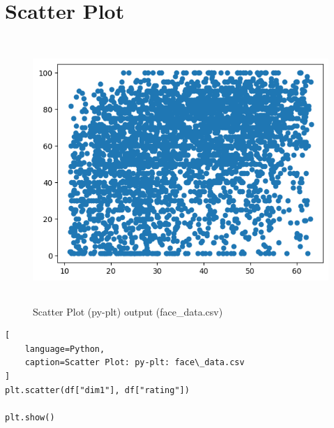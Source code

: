 \section{Scatter Plot \cite{data/online/seaborn.scatterplot, data/online/seaborn.scatterplot, wiki/Scatter_plot}} \label{Visualizing Data/Scatter Plot}


\begin{table}[H]
\begin{minipage}[t]{0.35\linewidth}
\begin{figure}[H]
    \centering
    \includegraphics[width=0.9\linewidth, height=10cm, keepaspectratio]{images/data/__visualizations__/plt-scatter-dim1-rating-face-data.png}
    \caption{Scatter Plot (py-plt) output (face\_data.csv)}
\end{figure}
\end{minipage}
\hspace{0.2cm}
\vrule width 1pt
\hspace{0.5cm}
\begin{minipage}[t]{0.57\linewidth}
\begin{lstlisting}[
    language=Python,
    caption=Scatter Plot: py-plt: face\_data.csv
]
plt.scatter(df["dim1"], df["rating"])

plt.show()
\end{lstlisting}
\end{minipage}
\end{table}

